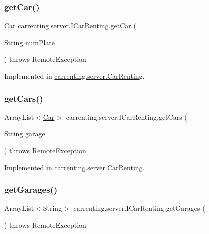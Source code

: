 \subsubsection{\texorpdfstring{getCar()}{getCar()}}
{\footnotesize\ttfamily \mbox{\hyperlink{classcarrenting_1_1server_1_1jdo_1_1_car}{Car}} carrenting.\+server.\+I\+Car\+Renting.\+get\+Car (\begin{DoxyParamCaption}\item[{String}]{num\+Plate }\end{DoxyParamCaption}) throws Remote\+Exception}



Implemented in \mbox{\hyperlink{classcarrenting_1_1server_1_1_car_renting_a7f49dd67da8352a564161f9a164523cf}{carrenting.\+server.\+Car\+Renting}}.

\mbox{\label{interfacecarrenting_1_1server_1_1_i_car_renting_aeaa26a483ce5e53faab84b0e3be0f7c9}} 
\subsubsection{\texorpdfstring{getCars()}{getCars()}}
{\footnotesize\ttfamily Array\+List$<$\mbox{\hyperlink{classcarrenting_1_1server_1_1jdo_1_1_car}{Car}}$>$ carrenting.\+server.\+I\+Car\+Renting.\+get\+Cars (\begin{DoxyParamCaption}\item[{String}]{garage }\end{DoxyParamCaption}) throws Remote\+Exception}



Implemented in \mbox{\hyperlink{classcarrenting_1_1server_1_1_car_renting_a11dd014dde29a6d25450e6269ddb78c7}{carrenting.\+server.\+Car\+Renting}}.

\mbox{\label{interfacecarrenting_1_1server_1_1_i_car_renting_a3192598ccc120a739ca168df03c23681}} 
\subsubsection{\texorpdfstring{getGarages()}{getGarages()}}
{\footnotesize\ttfamily Array\+List$<$String$>$ carrenting.\+server.\+I\+Car\+Renting.\+get\+Garages (\begin{DoxyParamCaption}{ }\end{DoxyParamCaption}) throws Remote\+Exception}



